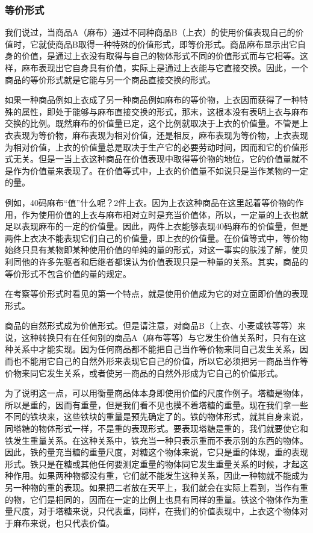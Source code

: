 \documentclass{ctexbook}
\begin{document}
            \subsubsection{等价形式}

            我们说过，当商品A（麻布）通过不同种商品B（上衣）的使用价值表现自己的价值时，它就使商品B取得一种特殊的价值形式，即等价形式。商品麻布显示出它自身的价值，是通过上衣没有取得与自己的物体形式不同的价值形式而与它相等。这样，麻布表现出它自身具有价值，实际上是通过上衣能与它直接交换。因此，一个商品的等价形式就是它能与另一个商品直接交换的形式。
            
            如果一种商品例如上衣成了另一种商品例如麻布的等价物，上衣因而获得了一种特殊的属性，即处于能够与麻布直接交换的形式，那末，这根本没有表明上衣与麻布交换的比例。既然麻布的价值量已定，这个比例就取决于上衣的价值量。不管是上衣表现为等价物，麻布表现为相对价值，还是相反，麻布表现为等价物，上衣表现为相对价值，上衣的价值量总是取决于生产它的必要劳动时间，因而和它的价值形式无关。但是一当上衣这种商品在价值表现中取得等价物的地位，它的价值量就不是作为价值量来表现了。在价值等式中，上衣的价值量不如说只是当作某物的一定的量。
            
            例如，40码麻布“值”什么呢？2件上衣。因为上衣这种商品在这里起着等价物的作用，作为使用价值的上衣与麻布相对立时是充当价值体，所以，一定量的上衣也就足以表现麻布的一定的价值量。因此，两件上衣能够表现40码麻布的价值量，但是两件上衣决不能表现它们自己的价值量，即上衣的价值量。在价值等式中，等价物始终只具有某物即某种使用价值的单纯的量的形式，对这一事实的肤浅了解，使贝利同他的许多先驱者和后继者都误认为价值表现只是一种量的关系。其实，商品的等价形式不包含价值的量的规定。
            
            在考察等价形式时看见的第一个特点，就是使用价值成为它的对立面即价值的表现形式。
            
            商品的自然形式成为价值形式。但是请注意，对商品B（上衣、小麦或铁等等）来说，这种转换只有在任何别的商品A（麻布等等）与它发生价值关系时，只有在这种关系中才能实现。因为任何商品都不能把自己当作等价物来同自己发生关系，因而也不能用它自己的自然外形来表现它自己的价值，所以它必须把另一商品当作等价物来同它发生关系，或者使另一商品的自然外形成为它自己的价值形式。
            
            为了说明这一点，可以用衡量商品体本身即使用价值的尺度作例子。塔糖是物体，所以是重的，因而有重量，但是我们看不见也摸不着塔糖的重量。现在我们拿一些不同的铁块来，这些铁块的重量是预先确定了的。铁的物体形式，就其自身来说，同塔糖的物体形式一样，不是重的表现形式。要表现塔糖是重的，我们就要使它和铁发生重量关系。在这种关系中，铁充当一种只表示重而不表示别的东西的物体。因此，铁的量充当糖的重量尺度，对糖这个物体来说，它只是重的体现，重的表现形式。铁只是在糖或其他任何要测定重量的物体同它发生重量关系的时候，才起这种作用。如果两种物都没有重，它们就不能发生这种关系，因此一种物就不能成为另一种物的重的表现。如果把二者放在天平上，我们就会在实际上看到，当作有重的物，它们是相同的，因而在一定的比例上也具有同样的重量。铁这个物体作为重量尺度，对于塔糖来说，只代表重，同样，在我们的价值表现中，上衣这个物体对于麻布来说，也只代表价值。
            
\end{document}

